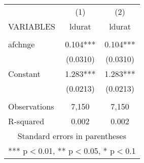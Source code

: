 \documentclass[]{article}
\begin{document}
\begin{tabular}{lcc} \hline
 & (1) & (2) \\
VARIABLES & ldurat & ldurat \\ \hline
 &  &  \\
afchnge & 0.104*** & 0.104*** \\
 & (0.0310) & (0.0310) \\
Constant & 1.283*** & 1.283*** \\
 & (0.0213) & (0.0213) \\
 &  &  \\
Observations & 7,150 & 7,150 \\
 R-squared & 0.002 & 0.002 \\ \hline
\multicolumn{3}{c}{ Standard errors in parentheses} \\
\multicolumn{3}{c}{ *** p$<$0.01, ** p$<$0.05, * p$<$0.1} \\
\end{tabular}
\end{document}
